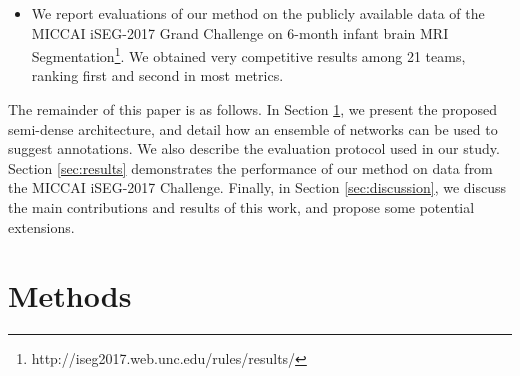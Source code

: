 \documentclass[twoside,espcrc2]{elsarticle}
\begin{document}
\begin{itemize}
\item We report evaluations of our method on the publicly available data of the MICCAI iSEG-2017 Grand Challenge on 6-month infant brain MRI Segmentation\footnote{http://iseg2017.web.unc.edu/rules/results/}. We obtained very competitive results among 21 teams, ranking first and second in most metrics.





\end{itemize}

The remainder of this paper is as follows. In Section \ref{sec:methods}, we present the proposed semi-dense architecture, and detail how an ensemble of networks can be used to suggest annotations. We also describe the evaluation protocol used in our study. Section \ref{sec:results} demonstrates the performance of our method on data from the MICCAI iSEG-2017 Challenge. Finally, in Section \ref{sec:discussion}, we discuss the main contributions and results of this work, and propose some potential extensions.






\section{Methods}\label{sec:methods}
\end{document}
